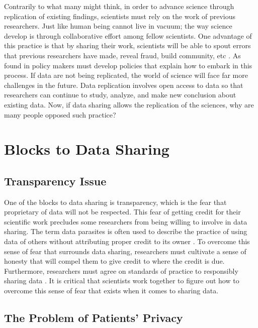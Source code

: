 \documentclass[sigconf]{acmart}
\begin{document}
Contrarily to what many might think, in order to advance science through replication of existing findings, scientists must rely on the work of previous researchers. Just like human being cannot live in vacuum; the way science develop is through collaborative effort among fellow scientists. One advantage of this practice is that by sharing their work, scientists will be able to spout errors that previous researchers have made, reveal fraud, build community, etc \cite{leetaru2016}. As found in \cite{borgman2012conundrum} policy makers must develop policies that explain how to embark in this process. If data are not being replicated, the world of science will face far more challenges in the future. Data replication involves open access to data so that researchers can continue to study, analyze, and make new conclusion about existing data. Now, if data sharing allows the replication of the sciences, why are many people opposed such practice? 



\section{Blocks to Data Sharing}

\subsection{Transparency Issue}

One of the blocks to data sharing is transparency, which is the fear that proprietary of data will not be respected. This fear of getting credit for their scientific work precludes some researchers from being willing to involve in data sharing. The term data parasites
 is often used to describe the practice of using data of others without attributing proper credit to its owner \cite{leetaru2016}. To overcome this sense of fear that surrounds data sharing, researchers must cultivate a sense of honesty that will compel them to give credit to where the credit is due. Furthermore, researchers must agree on standards of practice to responsibly sharing data \cite{borgman2012conundrum}.  It is critical that scientists work together to figure out how to overcome this sense of fear that exists when it comes to sharing data. 

\subsection{The Problem of Patients' Privacy}
\end{document}
